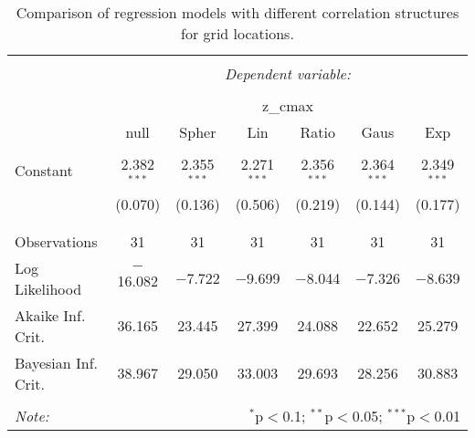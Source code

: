 \documentclass{article}\usepackage[]{graphicx}\usepackage[]{color}
\begin{document}
\begin{table}[!htbp] \centering 
  \caption{Comparison of regression models with different correlation structures for grid locations.} 
  \label{} 
\begin{tabular}{@{\extracolsep{5pt}}lcccccc} 
\\[-1.8ex]\hline 
\hline \\[-1.8ex] 
 & \multicolumn{6}{c}{\textit{Dependent variable:}} \\ 
\cline{2-7} 
\\[-1.8ex] & \multicolumn{6}{c}{z\_cmax} \\ 
 & null & Spher & Lin & Ratio & Gaus & Exp \\ 
\hline \\[-1.8ex] 
 Constant & 2.382$^{***}$ & 2.355$^{***}$ & 2.271$^{***}$ & 2.356$^{***}$ & 2.364$^{***}$ & 2.349$^{***}$ \\ 
  & (0.070) & (0.136) & (0.506) & (0.219) & (0.144) & (0.177) \\ 
  & & & & & & \\ 
\hline \\[-1.8ex] 
Observations & 31 & 31 & 31 & 31 & 31 & 31 \\ 
Log Likelihood & $-$16.082 & $-$7.722 & $-$9.699 & $-$8.044 & $-$7.326 & $-$8.639 \\ 
Akaike Inf. Crit. & 36.165 & 23.445 & 27.399 & 24.088 & 22.652 & 25.279 \\ 
Bayesian Inf. Crit. & 38.967 & 29.050 & 33.003 & 29.693 & 28.256 & 30.883 \\ 
\hline 
\hline \\[-1.8ex] 
\textit{Note:}  & \multicolumn{6}{r}{$^{*}$p$<$0.1; $^{**}$p$<$0.05; $^{***}$p$<$0.01} \\ 
\end{tabular} 
\end{table} 
\end{document}
